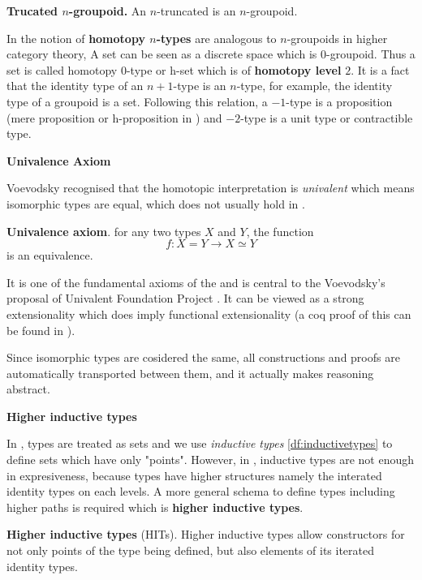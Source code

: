 \begin{definition}
\textbf{Trucated $n$-groupoid.}
An $n$-truncated \ogs is an $n$-groupoid.
\end{definition}

In \hott the notion of \textbf{homotopy $n$-types} are analogous to $n$-groupoids in higher category theory,
A set can be seen as a discrete space which is $0$-groupoid. Thus a set is called homotopy $0$-type or h-set which is of \textbf{homotopy level} $2$. It is a fact that the identity type of an $n+1$-type is an $n$-type, for example, the identity type of a groupoid is a set. Following this relation, a $-1$-type is a proposition (mere proposition or h-proposition in \hott) and $-2$-type is a unit type or contractible type.

\textbf{Univalence Axiom}

Voevodsky recognised that the homotopic interpretation is \emph{univalent} which means isomorphic types are equal, which does not usually hold in \itt. 

\begin{definition}
\textbf{Univalence axiom}. for any two types $X$ and $Y$, the function 
$$f : X = Y \to X \simeq Y$$ is an equivalence.
\end{definition}

It is one of the fundamental axioms of the \hott and is central to the Voevodsky's proposal of Univalent Foundation Project \cite{vv_uf}. 
It can be viewed as a strong extensionality which does imply functional extensionality (a coq proof of this can be found in \cite{uafe}). 

Since isomorphic types are cosidered the same, all constructions and proofs are automatically transported between them, and it actually makes reasoning abstract.


\textbf{Higher inductive types}

In \itt, types are treated as sets and we use \emph{inductive types} \ref{df:inductivetypes} to define sets which have only "points". However, in \hott, inductive types are not enough in expresiveness, because types have higher structures namely the interated identity types on each levels.
A more general schema to define types including higher paths is required which is \textbf{higher inductive types}. 

\begin{definition}
\textbf{Higher inductive types} (HITs).
Higher inductive types allow constructors for not only points of the type being defined, but also elements of its iterated identity types.
\end{definition}

